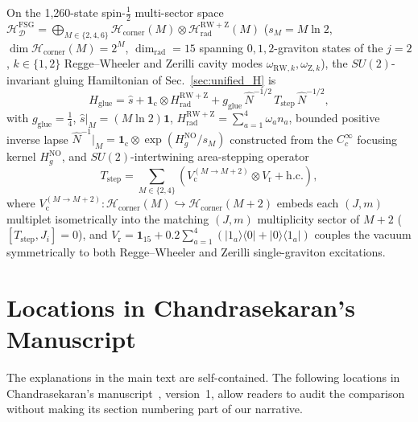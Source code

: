 \documentclass[onecolumn,11pt,aps,prd,amsmath,amssymb,nofootinbib,floatfix]{revtex4-2}
\newcommand{\scrD}{\mathscr{D}}
\newcommand{\calH}{\mathcal{H}}
\begin{document}
On the 1,260-state spin-$\frac{1}{2}$ multi-sector space $\calH_{\scrD}^{\mathrm{FSG}}=\bigoplus_{M\in\{2,4,6\}}\calH_{\mathrm{corner}}(M)\otimes\calH_{\mathrm{rad}}^{\mathrm{RW+Z}}(M)$ ($s_M=M\ln 2$, $\dim\calH_{\mathrm{corner}}(M)=2^M$, $\dim_{\mathrm{rad}}=15$ spanning $0,1,2$-graviton states of the $j=2$, $k\in\{1,2\}$ Regge--Wheeler and Zerilli cavity modes $\omega_{\mathrm{RW},k},\omega_{\mathrm{Z},k}$), the $SU(2)$-invariant gluing Hamiltonian of Sec.~\ref{sec:unified_H} is
\begin{equation}\label{eq:explicit_HFSG}
H_{\mathrm{glue}} = \hat{s} + \mathbf{1}_{\mathrm{c}}\otimes H_{\mathrm{rad}}^{\mathrm{RW+Z}}
+ g_{\mathrm{glue}}\,\widehat{N}^{-1/2}\,T_{\mathrm{step}}\,\widehat{N}^{-1/2},
\end{equation}
with $g_{\mathrm{glue}}=\frac{1}{4}$, $\hat{s}|_M=(M\ln 2)\mathbf{1}$, $H_{\mathrm{rad}}^{\mathrm{RW+Z}}=\sum_{a=1}^4 \omega_a n_a$, bounded positive inverse lapse $\widehat{N}^{-1}|_M=\mathbf{1}_{\mathrm{c}}\otimes\exp(H_g^{\mathrm{NO}}/s_M)$ constructed from the $C^\infty_c$ focusing kernel $H_g^{\mathrm{NO}}$, and $SU(2)$-intertwining area-stepping operator
\begin{equation}\label{eq:explicit_Tstep}
T_{\mathrm{step}} = \sum_{M\in\{2,4\}}\!\left(V_{\mathrm{c}}^{(M\to M+2)}\otimes V_{\mathrm{r}} + \mathrm{h.c.}\right),
\end{equation}
where $V_{\mathrm{c}}^{(M\to M+2)}:\calH_{\mathrm{corner}}(M)\hookrightarrow\calH_{\mathrm{corner}}(M+2)$ embeds each $(J,m)$ multiplet isometrically into the matching $(J,m)$ multiplicity sector of $M+2$ ($[T_{\mathrm{step}},J_i]=0$), and $V_{\mathrm{r}}=\mathbf{1}_{15}+0.2\sum_{a=1}^4(|1_a\rangle\langle 0|+|0\rangle\langle 1_a|)$ couples the vacuum symmetrically to both Regge--Wheeler and Zerilli single-graviton excitations.


\section{Locations in Chandrasekaran's Manuscript}\label{app:comparison}

The explanations in the main text are self-contained. The following locations in Chandrasekaran's manuscript~\cite{Chandrasekaran2026}, version~1, allow readers to audit the comparison without making its section numbering part of our narrative.
\end{document}

